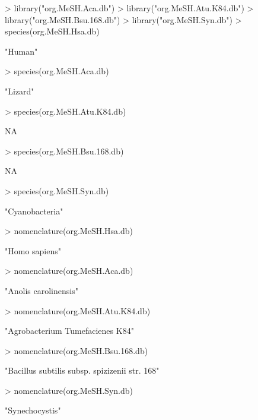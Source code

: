 \documentclass[11pt]{article}
\begin{document}
\begin{center}
\begin{Schunk}
\begin{Sinput}
> library("org.MeSH.Aca.db")
> library("org.MeSH.Atu.K84.db")
> library("org.MeSH.Bsu.168.db")
> library("org.MeSH.Syn.db")
> species(org.MeSH.Hsa.db)
\end{Sinput}
\begin{Soutput}
[1] "Human"
\end{Soutput}
\begin{Sinput}
> species(org.MeSH.Aca.db)
\end{Sinput}
\begin{Soutput}
[1] "Lizard"
\end{Soutput}
\begin{Sinput}
> species(org.MeSH.Atu.K84.db)
\end{Sinput}
\begin{Soutput}
[1] NA
\end{Soutput}
\begin{Sinput}
> species(org.MeSH.Bsu.168.db)
\end{Sinput}
\begin{Soutput}
[1] NA
\end{Soutput}
\begin{Sinput}
> species(org.MeSH.Syn.db)
\end{Sinput}
\begin{Soutput}
[1] "Cyanobacteria"
\end{Soutput}
\begin{Sinput}
> nomenclature(org.MeSH.Hsa.db)
\end{Sinput}
\begin{Soutput}
[1] "Homo sapiens"
\end{Soutput}
\begin{Sinput}
> nomenclature(org.MeSH.Aca.db)
\end{Sinput}
\begin{Soutput}
[1] "Anolis carolinensis"
\end{Soutput}
\begin{Sinput}
> nomenclature(org.MeSH.Atu.K84.db)
\end{Sinput}
\begin{Soutput}
[1] "Agrobacterium Tumefacienes K84"
\end{Soutput}
\begin{Sinput}
> nomenclature(org.MeSH.Bsu.168.db)
\end{Sinput}
\begin{Soutput}
[1] "Bacillus subtilis subsp. spizizenii str. 168"
\end{Soutput}
\begin{Sinput}
> nomenclature(org.MeSH.Syn.db)
\end{Sinput}
\begin{Soutput}
[1] "Synechocystis"
\end{Soutput}
\end{Schunk}
\end{center}
\end{document}

